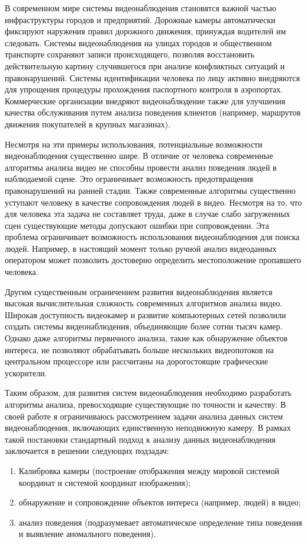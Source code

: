 
{\actuality}

В современном мире системы видеонаблюдения становятся важной частью инфраструктуры городов и предприятий. Дорожные камеры автоматически фиксируют наружения правил дорожного движения, принуждая водителей им следовать. Системы видеонаблюдения на улицах городов и общественном транспорте сохраняют записи происходящего, позволяя восстановить действительную картину случившегося при анализе конфликтных ситуаций и правонарушений. Системы идентификации человека по лицу активно внедряются для упрощения процедуры прохождения паспортного контроля в аэропортах. Коммерческие организации внедряют видеонаблюдение также для улучшения качества обслуживания путем анализа поведения клиентов (например, маршрутов движения покупателей в крупных магазинах).

Несмотря на эти примеры использования, потенциальные возможности видеонаблюдения существенно шире. В отличие от человека современные алгоритмы анализа видео не способны провести анализ поведения людей в наблюдаемой сцене. Это ограничивает возможность предотвращения правонарушений на ранней стадии. Также современные алгоритмы существенно уступают человеку в качестве сопровождения людей в видео. Несмотря на то, что для человека эта задача не составляет труда, даже в случае слабо загруженных сцен существующие методы допускают ошибки при сопровождении. Эта проблема ограничивает возможность использования видеонаблюдения для поиска людей. Например, в настоящий момент только ручной анализ видеоданных оператором может позволить достоверно определить местоположение пропавшего человека.

Другим существенным ограничением развития видеонаблюдения является высокая вычислительная сложность современных алгоритмов анализа видео. Широкая доступность видеокамер и развитие компьютерных сетей позволили создать системы видеонаблюдения, объединяющие более сотни тысяч камер. Однако даже алгоритмы первичного анализа, такие как обнаружение объектов интереса, не позволяют обрабатывать больше нескольких видеопотоков на центральном процессоре или рассчитаны на дорогостоящие графические ускорители.

Таким образом, для развития систем видеонаблюдения необходимо разработать алгоритмы анализа, превосходящие существующие по точности и качеству. В своей работе я ограничиваюсь рассмотрением задачи анализа данных систем видеонаблюдения, включающих единственную неподвижную камеру. В рамках такой постановки стандартный подход \cite{wang2013intelligent} к анализу данных видеонаблюдения заключается в решении следующих подзадач:
\begin{enumerate}
	\item Калибровка камеры (построение отображения между мировой системой координат и системой координат изображения);
	\item обнаружение и сопровождение объектов интереса (например, людей) в видео;
	\item анализ поведения (подразумевает автоматическое определение типа поведения и выявление аномального поведения).
\end{enumerate}


